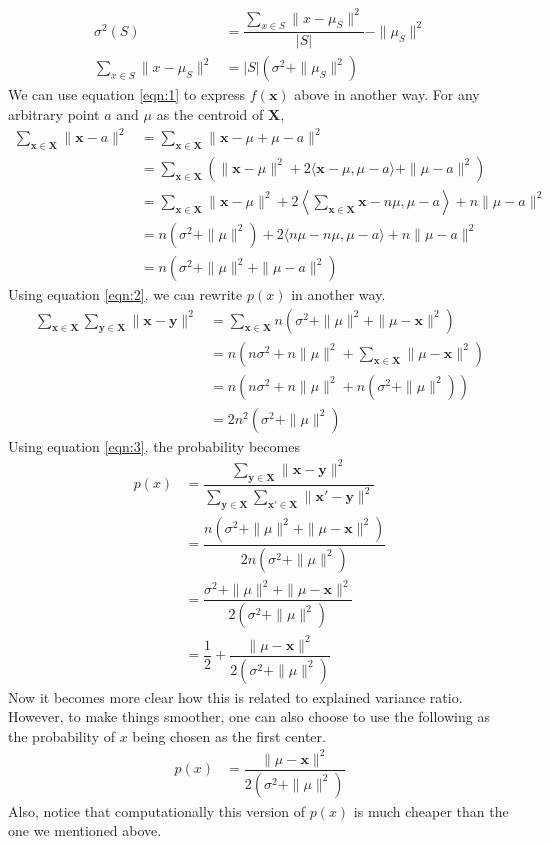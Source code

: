 \documentclass[twoside, 11pt]{article}
\newcommand{\x}{\mathbf{x}}
\newcommand{\X}{\mathbf{X}}
\newcommand{\y}{\mathbf{y}}
\begin{document}
		\begin{align}
			\sigma^2(S) & = \dfrac{\sum_{x\in S} \|x-\mu_{S}\|^2}{|S|}-\|\mu_{S}\|^2\nonumber\\
			\sum_{x\in S}\|x-\mu_{S}\|^2 & = |S|(\sigma^2+\|\mu_{S}\|^2)\label{eqn:1}
		\end{align}
	We can use equation \eqref{eqn:1} to express $f(\x)$ above in another way. For any arbitrary point $a$ and $\mu$ as the centroid of $\X$,
		\begin{align}
			\sum_{\x\in\X}\|\x-a\|^2
				  & = \sum_{\x\in\X}\|\x-\mu+\mu-a\|^2\nonumber\\
				  & = \sum_{\x\in\X}\left(\|\x-\mu\|^2+2\langle\x-\mu,\mu-a\rangle+\|\mu-a\|^2\right)\nonumber\\
				  & = \sum_{\x\in\X}\|\x-\mu\|^2+2\left\langle\sum_{\x\in\X}\x-n\mu,\mu-a\right\rangle+n\|\mu-a\|^2\nonumber\\
				  & = n(\sigma^2+\|\mu\|^2)+2\langle n\mu-n\mu,\mu-a\rangle+n\|\mu-a\|^2\nonumber\\
				  & = n(\sigma^2+\|\mu\|^2+\|\mu-a\|^2)\label{eqn:2}
		\end{align}
	Using equation \eqref{eqn:2}, we can rewrite $p(x)$ in another way.
		\begin{align}
			\sum_{\x\in\X}\sum_{\y\in\X}\|\x-\y\|^2 
				& = \sum_{\x\in\X}n(\sigma^2+\|\mu\|^2+\|\mu-\x\|^2)\nonumber\\
				& = n(n\sigma^2+n\|\mu\|^2+\sum_{\x\in\X}\|\mu-\x\|^2)\nonumber\\
				& = n(n\sigma^2+n\|\mu\|^2+n(\sigma^2+\|\mu\|^2))\nonumber\\
				& = 2n^2(\sigma^2+\|\mu\|^2)\label{eqn:3}
		\end{align}
	Using equation \eqref{eqn:3}, the probability becomes
		\begin{align*}
			p(x) & = \dfrac{\sum_{\y\in\X}\|\x-\y\|^2}{\sum_{\y\in\X}\sum_{\x'\in\X}\|\x'-\y\|^2}\\
				 & = \dfrac{n(\sigma^2+\|\mu\|^2+\|\mu-\x\|^2)}{2n(\sigma^2+\|\mu\|^2)}\\
				 & = \dfrac{\sigma^2+\|\mu\|^2+\|\mu-\x\|^2}{2(\sigma^2+\|\mu\|^2)}\\
				 & = \dfrac{1}{2}+\dfrac{\|\mu-\x\|^2}{2(\sigma^2+\|\mu\|^2)}
		\end{align*}
	Now it becomes more clear how this is related to explained variance ratio. However, to make things smoother, one can also choose to use the following as the probability of $x$ being chosen as the first center.
		\begin{align*}
			p(x) & = \dfrac{\|\mu-\x\|^2}{2(\sigma^2+\|\mu\|^2)}
		\end{align*}
	Also, notice that computationally this version of $p(x)$ is much cheaper than the one we mentioned above.
\end{document}
